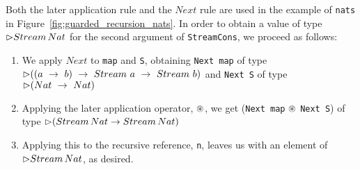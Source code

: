 Both the later application rule and the $Next$ rule are used in the example of
\texttt{nats} in Figure~\ref{fig:guarded_recursion_nats}. In order to obtain a
value of type $\rhd Stream\,Nat$ for the second argument of
\texttt{StreamCons}, we proceed as follows:

\begin{enumerate}
\item We apply $Next$ to \texttt{map} and \texttt{S}, obtaining
  \texttt{Next~map} of type ${\rhd((a~\rightarrow~b)~\rightarrow~Stream~a~\rightarrow~Stream~b)}$
    and \texttt{Next~S} of type ${\rhd(Nat~\rightarrow~Nat)}$
\item Applying the later application operator, $\circledast$, we get
  (\texttt{Next~map} $\circledast$ \texttt{Next~S}) of type 
    ${\rhd(Stream\,Nat \rightarrow Stream\,Nat)}$
  
\item Applying this to the recursive reference, \texttt{n}, leaves us with an element of ${\rhd Stream\,Nat}$, as desired.
\end{enumerate}


